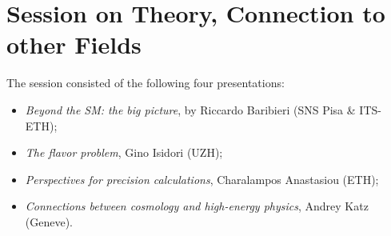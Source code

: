 \section{Session on Theory, Connection to other Fields}\label{theory}



The session consisted of the following four presentations:

\begin{itemize}
\item{\em Beyond the SM: the big picture},  by  Riccardo Baribieri (SNS Pisa \& ITS-ETH);
\item{\em  The flavor problem}, Gino Isidori (UZH); 
\item{\em  Perspectives for precision calculations}, Charalampos Anastasiou (ETH);
\item{\em  Connections between cosmology and high-energy physics}, Andrey Katz (Geneve).
\end{itemize}

